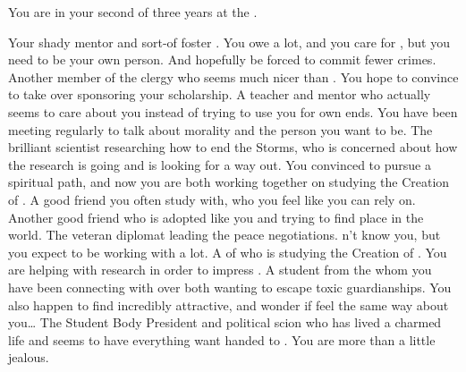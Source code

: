 \documentclass[char]{GL2020}
\begin{document}
\begin{itemz}[Notes]
    \item You are in your second of three years at the \pSchool{}.
\end{itemz}

\begin{contacts}
    \contact{\cAntiChup{}} Your shady mentor and sort-of foster \cAntiChup{\parent}. You owe \cAntiChup{\them} a lot, and you care for \cAntiChup{\them}, but you need to be your own person. And hopefully be forced to commit fewer crimes.
    \contact{\cBeetle{}} Another member of the \pTech{} clergy who seems much nicer than \cAntiChup{}. You hope to convince \cBeetle{\them} to take over sponsoring your scholarship.
    \contact{\cEthics{}} A teacher and mentor who actually seems to care about you instead of trying to use you for \cEthics{\their} own ends. You have been meeting regularly to talk about morality and the person you want to be.
    \contact{\cHeadScientist{}} The brilliant scientist researching how to end the Storms, who is concerned about how the research is going and is looking for a way out. You convinced \cHeadScientist{\them} to pursue a spiritual path, and now you are both working together on studying the Creation of \pEarth{}.
    \contact{\cTechStar{}} A good friend you often study with, who you feel like you can rely on.
    \contact{\cAmbition{}} Another good friend who is adopted like you and trying to find \cAmbition{\their} place in the world.
    \contact{\cDiplomat{}} The veteran \pTech{} diplomat leading the peace negotiations. \cDiplomat{\They} \cDiplomat{\do}n't know you, but you expect to be working with \cDiplomat{\them} a lot.
    \contact{\cEbbPriest{}} A \pShippie{} \cEbbPriest{\cleric} of \cEbb{} who is studying the Creation of \pEarth{}. You are helping with \cEbbPriest{\their} research in order to impress \cBeetle{}.
    \contact{\cAdopted{}} A student from the \pFarm{} whom you have been connecting with over both wanting to escape toxic guardianships. You also happen to find \cAdopted{\them} incredibly attractive, and wonder if \cAdopted{\they} feel\cAdopted{\verbs} the same way about you…
    \contact{\cPresident{\full}} The Student Body President and political scion who has lived a charmed life and seems to have everything \cPresident{\they} want handed to \cPresident{\them}. You are more than a little jealous.
\end{contacts}
\end{document}
